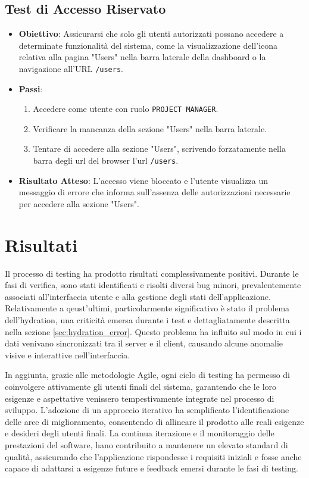 \documentclass[target=bach,aauheader=,style=]{thud}
\begin{document}
\subsection{Test di Accesso Riservato}
\begin{itemize}
    \item \textbf{Obiettivo}: Assicurarsi che solo gli utenti autorizzati possano accedere a determinate funzionalità del sistema, come la visualizzazione dell'icona relativa alla pagina "Users" nella barra laterale della dashboard o la navigazione all'URL \texttt{/users}.
    \item \textbf{Passi}:
    \begin{enumerate}
        \item Accedere come utente con ruolo \texttt{PROJECT MANAGER}.
        \item Verificare la mancanza della  sezione "Users" nella barra laterale.
        \item Tentare di accedere alla sezione "Users", scrivendo forzatamente nella barra degli url del browser l'url \texttt{/users}.
    \end{enumerate}
    \item \textbf{Risultato Atteso}: L'accesso viene bloccato e l'utente visualizza un messaggio di errore che informa sull'assenza delle autorizzazioni necessarie per accedere alla sezione "Users".
\end{itemize}

\section{Risultati}
Il processo di testing ha prodotto risultati complessivamente positivi. Durante le fasi di verifica, sono stati identificati e risolti diversi bug minori, prevalentemente associati all'interfaccia utente e alla gestione degli stati dell'applicazione. Relativamente a qeust'ultimi, particolarmente significativo è stato il problema dell'hydration, una criticità emersa durante i test e dettagliatamente descritta nella sezione \ref{sec:hydration_error}. Questo problema ha influito sul modo in cui i dati venivano sincronizzati tra il server e il client, causando alcune anomalie visive e interattive nell'interfaccia.

\noindent In aggiunta, grazie alle metodologie Agile, ogni ciclo di testing ha permesso di coinvolgere attivamente gli utenti finali del sistema, garantendo che le loro esigenze e aspettative venissero tempestivamente integrate nel processo di sviluppo. L'adozione di un approccio iterativo ha semplificato l'identificazione delle aree di miglioramento, consentendo di allineare il prodotto alle reali esigenze e desideri degli utenti finali. La continua iterazione e il monitoraggio delle prestazioni del software, hano contribuito a mantenere un elevato standard di qualità, assicurando che l'applicazione rispondesse i requisiti iniziali e fosse anche capace di adattarsi a esigenze future e feedback emersi durante le fasi di testing.
\end{document}
